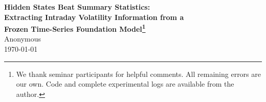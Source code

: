 \documentclass[12pt]{article}
\begin{document}
\begin{titlepage}
\begin{center}
{\Large\bfseries Hidden States Beat Summary Statistics:\\[2pt]
Extracting Intraday Volatility Information from a\\[2pt]
Frozen Time-Series Foundation Model\footnote{We thank seminar participants for
helpful comments. All remaining errors are our own. Code and complete
experimental logs are available from the author.}}\\[20pt]

{\large Anonymous}\\[2pt]
{\today}
\end{center}


\end{titlepage}
\end{document}
